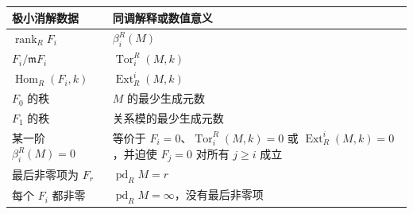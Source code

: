 \begin{center}
	\begin{minipage}{\textwidth}
		\makeatletter
		\def\@captype{table}
		\makeatother
		\centering
		\caption[极小自由消解的同调解释]{极小自由消解的同调解释。设 \((R,\mathfrak m)\) 为交换 Noether 局部环，\(k=R/\mathfrak m\)，\(M\ne0\) 为有限生成的 \(R\) 模，\(F_\bullet\rightarrow M\rightarrow0\) 为其极小自由消解。下表中 \(i\ge0\)，关系模指极小满射 \(F_0\rightarrow M\) 的核。}
		\label{b3:tab:minimal-resolution-dictionary}
		\begin{tabularx}{\textwidth}{@{}>{\raggedright\arraybackslash}p{}>{\raggedright\arraybackslash}X@{}}
			\toprule
			极小消解数据 & 同调解释或数值意义\\
			\midrule
			\(\operatorname{rank}_R F_i\) & \(\beta_i^R(M)\)\\
			\(F_i/\mathfrak mF_i\) & \(\operatorname{Tor}_i^R(M,k)\)\\
			\(\operatorname{Hom}_R(F_i,k)\) & \(\operatorname{Ext}_R^i(M,k)\)\\
			\(F_0\) 的秩 & \(M\) 的最少生成元数\\
			\(F_1\) 的秩 & 关系模的最少生成元数\\
			某一阶 \(\beta_i^R(M)=0\) & 等价于 \(F_i=0\)、\(\operatorname{Tor}_i^R(M,k)=0\) 或 \(\operatorname{Ext}_R^i(M,k)=0\)，并迫使 \(F_j=0\) 对所有 \(j\ge i\) 成立\\
			最后非零项为 \(F_r\) & \(\operatorname{pd}_RM=r\)\\
			每个 \(F_i\) 都非零 & \(\operatorname{pd}_RM=\infty\)，没有最后非零项\\
			\bottomrule
		\end{tabularx}
	\end{minipage}
\end{center}

